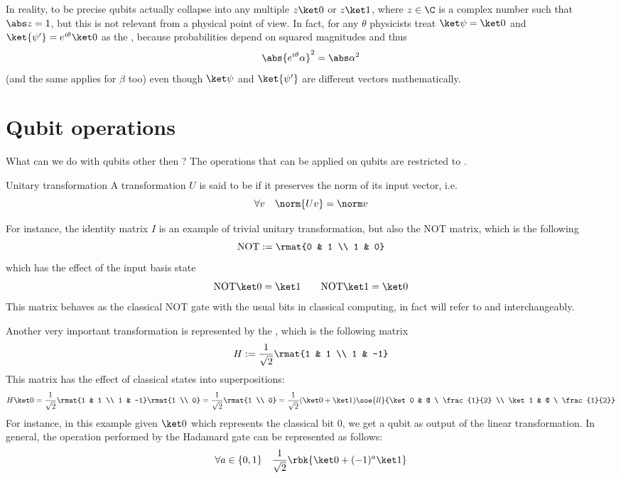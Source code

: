 \documentclass[a4paper, 12pt]{report}
\begin{document}
In reality, to be precise qubits actually collapse into any multiple $z \ket 0$ or $z\ket 1$, where $z \in \C$ is a complex number such that $\abs z = 1$, but this is not relevant from a physical point of view. In fact, for any $\theta$ physicists treat $\ket \psi = \ket 0$ and $\ket {\psi'} = e^{i \theta} \ket 0 $ as the , because probabilities depend on squared magnitudes and thus $$\abs{e^{i \theta} \alpha}^2 = \abs \alpha^2$$ (and the same applies for $\beta$ too) even though $\ket \psi$ and $\ket {\psi'}$ are different vectors mathematically.

\section{Qubit operations}

What can we do with qubits other then ? The operations that can be applied on qubits are restricted to .

\begin{frameddefn}{Unitary transformation}
	A transformation $U$ is said to be  if it preserves the norm of its input vector, i.e. $$\forall v \quad \norm{Uv} = \norm v$$
\end{frameddefn}

For instance, the identity matrix $I$ is an example of trivial unitary transformation, but also the NOT matrix, which is the following $$\mbox{NOT} := \rmat{0 & 1 \\ 1 & 0}$$ which has the effect of  the input basis state $$\mbox{NOT} \ket 0 = \ket 1 \quad \quad \mbox{NOT} \ket 1 = \ket 0$$ This matrix behaves as the classical NOT gate with the usual bits in classical computing, in fact will refer to  and  interchangeably.

Another very important transformation is represented by the , which is the following matrix $$H := \dfrac{1}{\sqrt 2}\rmat{1 & 1 \\ 1 & -1}$$ This matrix has the effect of  classical states into superpositions: $$H \ket 0 = \dfrac{1}{\sqrt 2}\rmat{1 & 1 \\ 1 & -1} \rmat{1 \\ 0} = \dfrac{1}{\sqrt 2} \rmat{1 \\ 0} = \dfrac{1}{\sqrt 2} (\ket 0 + \ket 1) \soe{ll}{\ket 0 & @ \  \frac{1}{2} \\ \ket 1 & @ \  \frac{1}{2}}$$ For instance, in this example given $\ket 0$ which represents the classical bit 0, we get a qubit as output of the linear transformation. In general, the operation performed by the Hadamard gate can be represented as follows: $$\forall a \in \{0, 1\} \quad \dfrac{1}{\sqrt 2} \rbk{\ket 0 + (-1)^a \ket 1}$$
\end{document}
